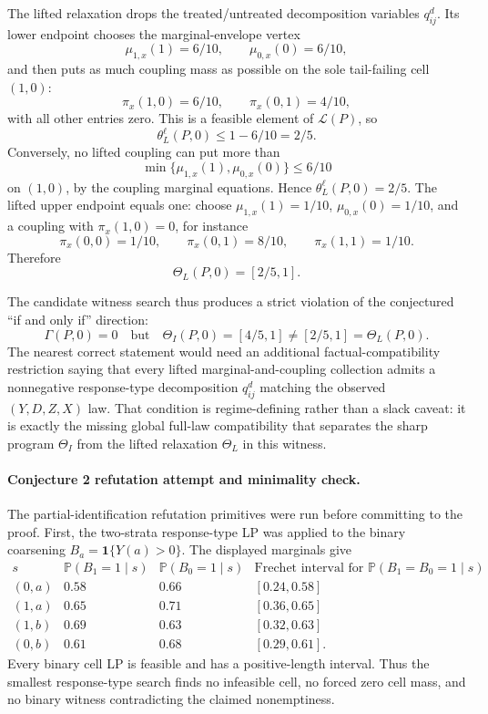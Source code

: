 \documentclass[11pt]{article}
\renewcommand{\Pr}{\mathbb{P}}
\newcommand{\one}{\mathbf{1}}
\theoremstyle{definition}
\theoremstyle{plain}
\theoremstyle{remark}
\begin{document}
The lifted relaxation drops the treated/untreated decomposition variables \(q^d_{ij}\).  Its lower endpoint chooses the marginal-envelope vertex
\[
\mu_{1,x}(1)=6/10,\qquad \mu_{0,x}(0)=6/10,
\]
and then puts as much coupling mass as possible on the sole tail-failing cell \((1,0)\):
\[
\pi_x(1,0)=6/10,\qquad \pi_x(0,1)=4/10,
\]
with all other entries zero.  This is a feasible element of \(\mathcal L(P)\), so
\[
\theta_L^\ell(P,0)\le 1-6/10=2/5.
\]
Conversely, no lifted coupling can put more than
\[
\min\{\mu_{1,x}(1),\mu_{0,x}(0)\}\le 6/10
\]
on \((1,0)\), by the coupling marginal equations.  Hence \(\theta_L^\ell(P,0)=2/5\).  The lifted upper endpoint equals one: choose \(\mu_{1,x}(1)=1/10\), \(\mu_{0,x}(0)=1/10\), and a coupling with \(\pi_x(1,0)=0\), for instance
\[
\pi_x(0,0)=1/10,\qquad \pi_x(0,1)=8/10,\qquad \pi_x(1,1)=1/10.
\]
Therefore
\[
\Theta_L(P,0)=[2/5,1].
\]

The candidate witness search thus produces a strict violation of the conjectured ``if and only if'' direction:
\[
\Gamma(P,0)=0
\quad\text{but}\quad
\Theta_I(P,0)=[4/5,1]\ne[2/5,1]=\Theta_L(P,0).
\]
The nearest correct statement would need an additional factual-compatibility restriction saying that every lifted marginal-and-coupling collection admits a nonnegative response-type decomposition \(q^d_{ij}\) matching the observed \((Y,D,Z,X)\) law.  That condition is regime-defining rather than a slack caveat: it is exactly the missing global full-law compatibility that separates the sharp program \(\Theta_I\) from the lifted relaxation \(\Theta_L\) in this witness.

\paragraph{Conjecture 2 refutation attempt and minimality check.}
The partial-identification refutation primitives were run before committing to the proof.  First, the two-strata response-type LP was applied to the binary coarsening \(B_a=\one\{Y(a)>0\}\).  The displayed marginals give
\[
\begin{array}{c|cc|c}
s & \Pr(B_1=1\mid s) & \Pr(B_0=1\mid s) &
\text{Frechet interval for }\Pr(B_1=B_0=1\mid s)\\ \hline
(0,a)&0.58&0.66&[0.24,0.58]\\
(1,a)&0.65&0.71&[0.36,0.65]\\
(1,b)&0.69&0.63&[0.32,0.63]\\
(0,b)&0.61&0.68&[0.29,0.61].
\end{array}
\]
Every binary cell LP is feasible and has a positive-length interval.  Thus the smallest response-type search finds no infeasible cell, no forced zero cell mass, and no binary witness contradicting the claimed nonemptiness.
\end{document}
